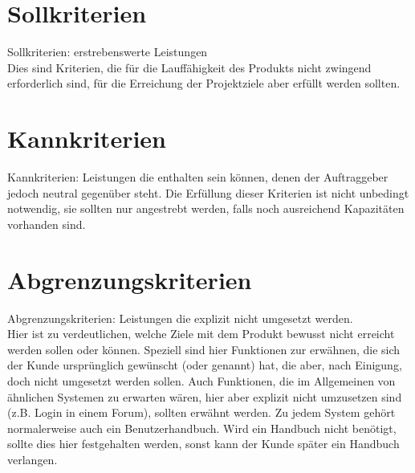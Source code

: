 
\section{Sollkriterien}\label{sec:sollkriterien}
Sollkriterien: erstrebenswerte Leistungen\\
Dies sind Kriterien, die für die Lauffähigkeit des Produkts nicht zwingend
erforderlich sind, für die Erreichung der Projektziele aber erfüllt werden
sollten.


\section{Kannkriterien}\label{sec:kannkriterien}

Kannkriterien: Leistungen die enthalten sein können, denen der Auftraggeber jedoch neutral gegenüber steht.
Die Erfüllung dieser Kriterien ist nicht unbedingt notwendig, sie sollten nur angestrebt werden, 
falls noch ausreichend Kapazitäten vorhanden sind.


\section{Abgrenzungskriterien}\label{sec:abgrenzungskriterien}
Abgrenzungskriterien: Leistungen die explizit nicht umgesetzt werden.\\
Hier ist zu verdeutlichen, welche Ziele mit dem Produkt bewusst nicht erreicht werden sollen oder können. 
Speziell sind hier Funktionen zur erwähnen, die sich der Kunde ursprünglich gewünscht (oder genannt) hat, die aber, nach Einigung, 
doch nicht umgesetzt werden sollen. Auch Funktionen, die im Allgemeinen von ähnlichen Systemen zu erwarten wären,
hier aber explizit nicht umzusetzen sind (z.B. Login in einem Forum), sollten erwähnt werden. 
Zu jedem System gehört normalerweise auch ein Benutzerhandbuch. Wird ein Handbuch nicht benötigt, 
sollte dies hier festgehalten werden, sonst kann der Kunde später ein Handbuch verlangen.

